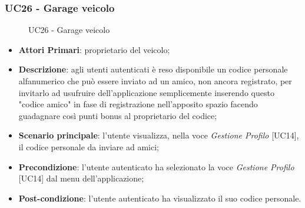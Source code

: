 \subsubsection{UC26 - Garage veicolo}
\begin{figure}[h]
	\centering
	\caption{UC26 - Garage veicolo}
\end{figure}
\begin{itemize}
	\item \textbf{Attori Primari}: proprietario del veicolo;
	\item \textbf{Descrizione}: agli utenti autenticati è reso disponibile un codice personale alfanumerico che può essere inviato ad un amico, non ancora registrato, per invitarlo ad usufruire dell'applicazione semplicemente inserendo questo "codice amico" in fase di registrazione nell'apposito spazio facendo guadagnare così punti bonus al proprietario del codice;
	\item \textbf{Scenario principale}: l'utente visualizza, nella voce \textit{Gestione Profilo} [UC14], il codice personale da inviare ad amici;
	\item \textbf{Precondizione}: l'utente autenticato ha selezionato la voce \textit{Gestione Profilo} [UC14] dal menu dell'applicazione;
	\item \textbf{Post-condizione}: l'utente autenticato ha visualizzato il suo codice personale. 
\end{itemize} 
